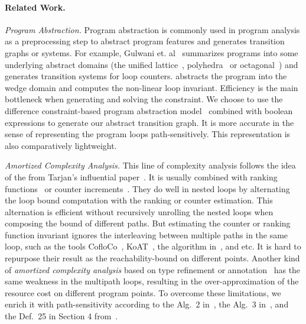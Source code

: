 \paragraph{Related Work.}
\emph{Program Abstraction.}
Program abstraction is commonly used in program analysis as a preprocessing step to abstract program features and generates transition graphs or systems. For example, Gulwani et. al~\cite{GulwaniZ10} summarizes programs into some underlying abstract domains (the unified lattice~\cite{CousotH78}, polyhedra~\cite{CousotC77} or octagonal~\cite{Mine06})
and generates transition systems for loop counters.
\cite{KincaidCBR18} abstracts the program into the wedge domain and computes the non-linear loop invariant.
Efficiency is the main bottleneck when generating and solving the constraint.
We choose to use the difference constraint-based program abstraction model~\cite{SinnZV17,SinnZV14} combined with boolean expressions to generate our abstract transition graph.
It is more accurate in the sense of representing the program loops path-sensitively. This representation is also comparatively lightweight.

\emph{Amortized Complexity Analysis.}
This line of complexity analysis follows the idea of the
from Tarjan's influential paper~\cite{PotechinP17}. It is usually combined with ranking functions~\cite{BradleyMS05,CookSZ13,Zuleger18} or counter increments~\cite{ZulegerGSV11,SinnZV14,SinnZV17,LuCT21,AliasDFG10}.
They do well in nested loops by alternating the loop bound computation with the ranking or counter estimation. This alternation is efficient without recursively unrolling the nested loops when composing the bound of different paths.
 But estimating the counter or ranking function invariant ignores the interleaving between multiple paths in the same loop,
such as the tools CofloCo~\cite{Montoya17,Flores-MontoyaH14,Flores-Montoya16}, KoAT~\cite{BrockschmidtEFFG16,BrockschmidtEFFG14,FalkeKS12,FalkeKS11}, the algorithm in~\cite{LuCT21}, and etc.
It is hard to repurpose their result as the reachability-bound on different points.
Another kind of \emph{amortized complexity analysis} based on type refinement or annotation~\cite{CraryW00,JostHLH10,CicekBG0H17,RajaniG0021,CarbonneauxHS15} has the same weakness in the multipath loops, resulting in the over-approximation of the resource cost on different program points.
To overcome these limitations, we enrich it with path-sensitivity according to the Alg.~2 in~\cite{SinnZV14},
the Alg.~3 in~\cite{ZulegerGSV11},
and the Def.~25 in Section 4 from~\cite{SinnZV17}.


